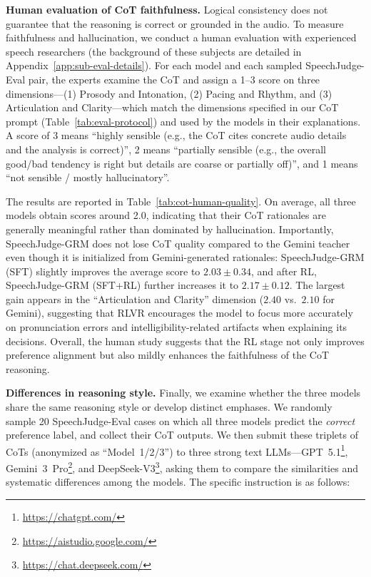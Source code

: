 \documentclass[]{bytedance_seed}
\begin{document}
\textbf{Human evaluation of CoT faithfulness.}\quad
Logical consistency does not guarantee that the reasoning is {correct} or
grounded in the audio.
To measure faithfulness and hallucination, we conduct a human evaluation with
experienced speech researchers (the background of these subjects are detailed in Appendix~\ref{app:sub-eval-details}).
For each model and each sampled {SpeechJudge-Eval} pair, the experts
examine the CoT and assign a 1--3 score on three dimensions—(1) Prosody and Intonation, (2) Pacing and Rhythm, and (3) Articulation and Clarity—which match the dimensions specified in our CoT prompt (Table~\ref{tab:eval-protocol}) and used by the models in their explanations.
A score of 3 means ``highly sensible (e.g., the CoT cites concrete audio details
and the analysis is correct)'', 2 means ``partially sensible (e.g., the overall
good/bad tendency is right but details are coarse or partially off)'', and 1
means ``not sensible / mostly hallucinatory''.

The results are reported in Table~\ref{tab:cot-human-quality}.
On average, all three models obtain scores around 2.0, indicating that their
CoT rationales are generally meaningful rather than dominated by hallucination.
Importantly, SpeechJudge-GRM does not lose CoT quality compared to the
Gemini teacher even though it is initialized from Gemini-generated rationales:
SpeechJudge-GRM (SFT) slightly improves the average score to $2.03\pm0.34$,
and after RL, SpeechJudge-GRM (SFT+RL) further increases it to
$2.17\pm0.12$.
The largest gain appears in the ``Articulation and Clarity'' dimension
($2.40$ vs.\ $2.10$ for Gemini), suggesting that RLVR encourages the model to
focus more accurately on pronunciation errors and intelligibility-related
artifacts when explaining its decisions.
Overall, the human study suggests that the RL stage not only improves
preference alignment but also mildly enhances the faithfulness of the CoT
reasoning.

\textbf{Differences in reasoning style.}\quad
Finally, we examine whether the three models share the same reasoning style or
develop distinct emphases.
We randomly sample 20 {SpeechJudge-Eval} cases on which all three models predict
the \textit{correct} preference label, and collect their CoT outputs.
We then submit these triplets of CoTs (anonymized as ``Model~1/2/3'') to three
strong text LLMs—GPT~5.1\footnote{\href{https://chatgpt.com/}{https://chatgpt.com/}}, Gemini~3~Pro\footnote{\href{https://aistudio.google.com/}{https://aistudio.google.com/}}, and DeepSeek-V3\footnote{\href{https://chat.deepseek.com/}{https://chat.deepseek.com/}}, asking them to compare the similarities
and systematic differences among the models. The specific instruction is as follows:
\end{document}

